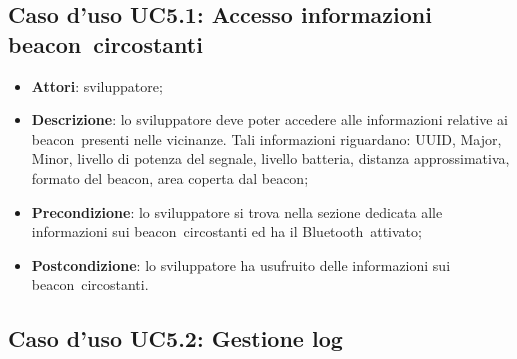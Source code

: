 \documentclass[../AnalisiDeiRequisiti.tex]{subfiles}
\begin{document}
\subsection{Caso d'uso UC5.1: Accesso informazioni beacon\g\ circostanti}
\begin{itemize}
\item \textbf{Attori}: sviluppatore;
\item \textbf{Descrizione}: lo sviluppatore deve poter accedere alle informazioni relative ai beacon\g\ presenti nelle vicinanze. Tali informazioni riguardano: UUID, Major, Minor, livello di potenza del segnale, livello batteria, distanza approssimativa, formato del beacon\g, area coperta dal beacon\g; 
      \item \textbf{Precondizione}: lo sviluppatore si trova nella sezione dedicata alle informazioni sui beacon\g\ circostanti ed ha il Bluetooth\g\ attivato;
    \item \textbf{Postcondizione}: lo sviluppatore ha usufruito delle informazioni sui beacon\g\ circostanti.
  \end{itemize}
\hypertarget{UC5.2}{}
\subsection{Caso d'uso UC5.2: Gestione log}
\end{document}

